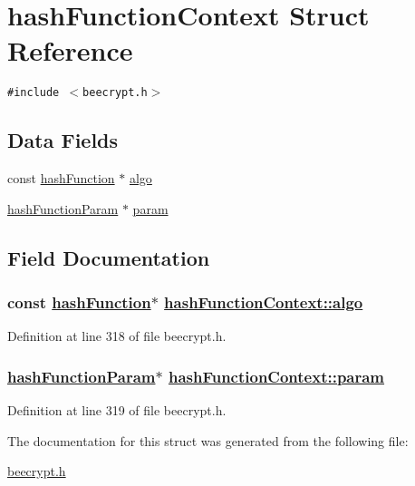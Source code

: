 \hypertarget{structhashFunctionContext}{
\section{hash\-Function\-Context Struct Reference}
\label{structhashFunctionContext}
}
{\tt \#include $<$beecrypt.h$>$}

\subsection*{Data Fields}
\begin{CompactItemize}
\item 
const \hyperlink{structhashFunction}{hash\-Function} $\ast$ \hyperlink{structhashFunctionContext_o0}{algo}
\item 
\hyperlink{group__HASH__m_ga0}{hash\-Function\-Param} $\ast$ \hyperlink{structhashFunctionContext_o1}{param}
\end{CompactItemize}


\subsection{Field Documentation}
\hypertarget{structhashFunctionContext_o0}{
\subsubsection[algo]{\setlength{\rightskip}{0pt plus 5cm}const \hyperlink{structhashFunction}{hash\-Function}$\ast$ \hyperlink{structhashFunctionContext_o0}{hash\-Function\-Context::algo}}}
\label{structhashFunctionContext_o0}


Definition at line 318 of file beecrypt.h.\hypertarget{structhashFunctionContext_o1}{
\subsubsection[param]{\setlength{\rightskip}{0pt plus 5cm}\hyperlink{group__HASH__m_ga0}{hash\-Function\-Param}$\ast$ \hyperlink{structhashFunctionContext_o1}{hash\-Function\-Context::param}}}
\label{structhashFunctionContext_o1}


Definition at line 319 of file beecrypt.h.

The documentation for this struct was generated from the following file:\begin{CompactItemize}
\item 
\hyperlink{beecrypt_8h}{beecrypt.h}\end{CompactItemize}
